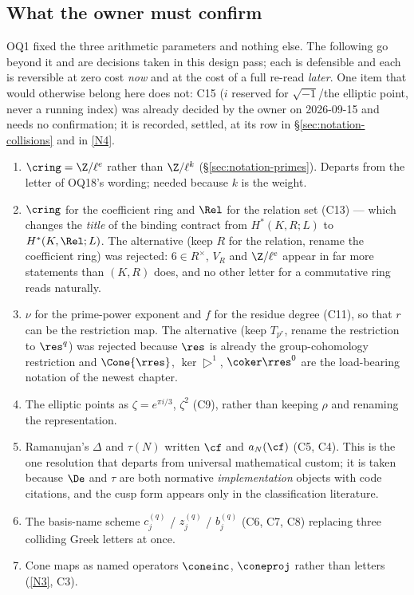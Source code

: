 \subsection{What the owner must confirm}\label{sec:notation-open}

OQ1 fixed the three arithmetic parameters and nothing else. The following go beyond
it and are decisions taken in this design pass; each is defensible and each is
reversible at zero cost \emph{now} and at the cost of a full re-read \emph{later}.
One item that would otherwise belong here does not: C15 ($i$ reserved for
$\sqrt{-1}$/the elliptic point, never a running index) was already decided by the
owner on 2026-09-15 and needs no confirmation; it is recorded, settled, at its row
in \S\ref{sec:notation-collisions} and in \ref{N4}.

\begin{enumerate}[label=(O\arabic*)]
\item\label{O1} $\cring=\Z/\ell^{e}$ rather than $\Z/\ell^{k}$
  (\S\ref{sec:notation-primes}). Departs from the letter of OQ18's wording; needed
  because $k$ is the weight.
\item\label{O2} $\cring$ for the coefficient ring and $\Rel$ for the relation set
  (C13) --- which changes the \emph{title} of the binding contract from
  $H^{\ast}(K,R;L)$ to $H^{\ast}(K,\Rel;L)$. The alternative (keep $R$ for the
  relation, rename the coefficient ring) was rejected: $6\in R^{\times}$, $V_R$ and
  $\Z/\ell^e$ appear in far more statements than $(K,R)$ does, and no other letter for
  a commutative ring reads naturally.
\item\label{O3} $\nu$ for the prime-power exponent and $f$ for the residue degree
  (C11), so that $r$ can be the restriction map. The alternative (keep
  $T_{p^r}$, rename the restriction to $\res^{q}$) was rejected because $\res$ is
  already the group-cohomology restriction and $\Cone{\rres}$, $\ker\rres^1$,
  $\coker\rres^0$ are the load-bearing notation of the newest chapter.
\item\label{O4} The elliptic points as $\zeta=e^{\pi i/3}$, $\zeta^2$
  (C9), rather than keeping $\rho$ and renaming the representation.
\item\label{O5} Ramanujan's $\Delta$ and $\tau(N)$ written $\cf$ and $a_N(\cf)$
  (C5, C4). This is the one resolution that departs from
  universal mathematical custom; it is taken because $\De$ and $\tau$ are both
  normative \emph{implementation} objects with code citations, and the cusp form
  appears only in the classification literature.
\item\label{O6} The basis-name scheme $c^{(q)}_j$ / $z^{(q)}_j$ / $b^{(q)}_j$
  (C6, C7, C8) replacing three colliding
  Greek letters at once.
\item\label{O7} Cone maps as named operators $\coneinc$, $\coneproj$ rather than
  letters (\ref{N3}, C3).
\end{enumerate}

